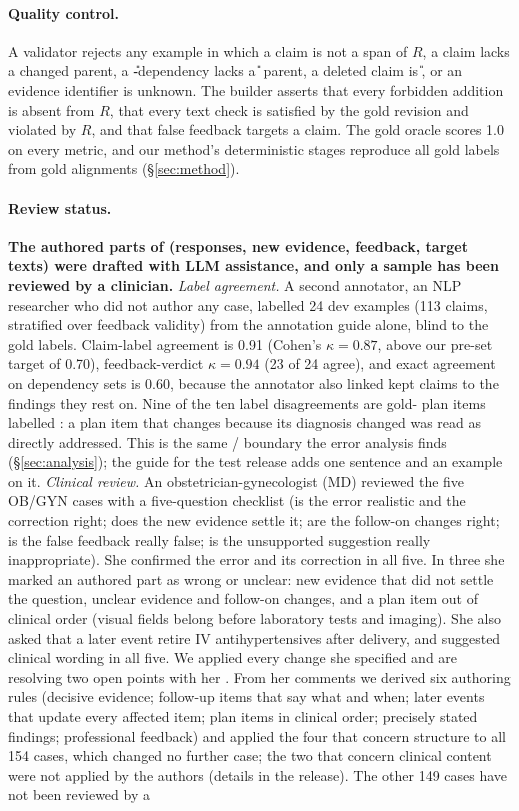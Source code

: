 \paragraph{Quality control.} A validator rejects any example in which a claim is not a span of $R$, a \Pp{} claim lacks a changed parent, a \U-dependency lacks a \U{} parent, a deleted claim is \U{}, or an evidence identifier is unknown. The builder asserts that every forbidden addition is absent from $R$, that every text check is satisfied by the gold revision and violated by $R$, and that false feedback targets a \K{} claim. The gold oracle scores 1.0 on every metric, and our method's deterministic stages reproduce all gold labels from gold alignments (\S\ref{sec:method}).

\paragraph{Review status.} \textbf{The authored parts of \ms{} (responses, new evidence, feedback, target texts) were drafted with LLM assistance, and only a sample has been reviewed by a clinician.} \emph{Label agreement.} A second annotator, an NLP researcher who did not author any case, labelled 24 dev examples (113 claims, stratified over feedback validity) from the annotation guide alone, blind to the gold labels. Claim-label agreement is 0.91 (Cohen's $\kappa=0.87$, above our pre-set target of 0.70), feedback-verdict $\kappa=0.94$ (23 of 24 agree), and exact agreement on dependency sets is 0.60, because the annotator also linked kept claims to the findings they rest on. Nine of the ten label disagreements are gold-\Pp{} plan items labelled \D{}: a plan item that changes because its diagnosis changed was read as directly addressed. This is the same \D{}/\Pp{} boundary the error analysis finds (\S\ref{sec:analysis}); the guide for the test release adds one sentence and an example on it. \emph{Clinical review.} An obstetrician-gynecologist (MD) reviewed the five OB/GYN cases with a five-question checklist (is the error realistic and the correction right; does the new evidence settle it; are the follow-on changes right; is the false feedback really false; is the unsupported suggestion really inappropriate). She confirmed the error and its correction in all five. In three she marked an authored part as wrong or unclear: new evidence that did not settle the question, unclear evidence and follow-on changes, and a plan item out of clinical order (visual fields belong before laboratory tests and imaging). She also asked that a later event retire IV antihypertensives after delivery, and suggested clinical wording in all five. We applied every change she specified and are resolving two open points with her . From her comments we derived six authoring rules (decisive evidence; follow-up items that say what and when; later events that update every affected item; plan items in clinical order; precisely stated findings; professional feedback) and applied the four that concern structure to all 154 cases, which changed no further case; the two that concern clinical content were not applied by the authors (details in the release). The other 149 cases have not been reviewed by a 